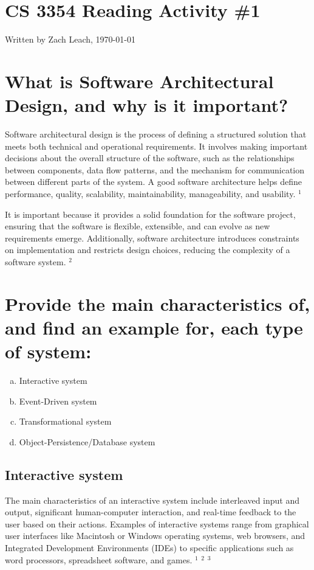 
\section*{\Huge\bfseries CS 3354 Reading Activity \#1}
Written by Zach Leach, \today

\section{What is Software Architectural Design, and why is it important?}
Software architectural design is the process of defining a structured solution that meets both technical and operational requirements. It involves making important decisions about the overall structure of the software, such as the relationships between components, data flow patterns, and the mechanism for communication between different parts of the system. A good software architecture helps define performance, quality, scalability, maintainability, manageability, and usability. 
\href{https://www.netsolutions.com/insights/why-software-architecture-matters-to-build-scalable-solutions/}{$^1$}

It is important because it provides a solid foundation for the software project, ensuring that the software is flexible, extensible, and can evolve as new requirements emerge. Additionally, software architecture introduces constraints on implementation and restricts design choices, reducing the complexity of a software system. 
\href{https://www.linkedin.com/pulse/8-reasons-why-software-architecture-important-ahad-khan-csm/}{$^2$}

\section{Provide the main characteristics of, and find an example for, each type of system:}
\begin{enumerate}[a.]
	\item Interactive system
	\item Event-Driven system
	\item Transformational system
	\item Object-Persistence/Database system
\end{enumerate}

\subsection{Interactive system}
The main characteristics of an interactive system include interleaved input and output, significant human-computer interaction, and real-time feedback to the user based on their actions. Examples of interactive systems range from graphical user interfaces like Macintosh or Windows operating systems, web browsers, and Integrated Development Environments (IDEs) to specific applications such as word processors, spreadsheet software, and games. 
\href{https://people.cs.pitt.edu/~chang/365/2petri/s2.htm}{$^1$}
\href{https://www.encyclopedia.com/computing/news-wires-white-papers-and-books/interactive-systems}{$^2$}
\href{https://www.geeksforgeeks.org/interactive-operating-system/}{$^3$}

